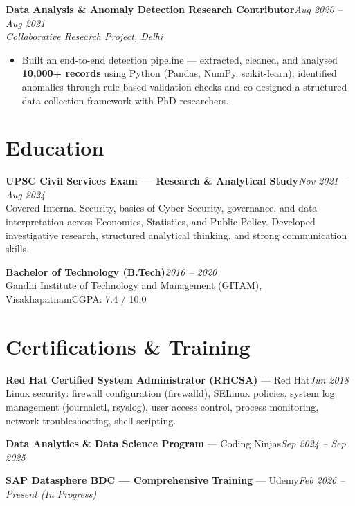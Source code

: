 \documentclass[10pt, letterpaper]{article}
\newcommand{\role}[3]{%
  \vspace{2pt}%
  {\bfseries #1}\hfill{\small\color{muted}\textit{#3}}\\[-2pt]%
  {\small\color{muted}\textit{#2}}%
}
\begin{document}
\vspace{1pt}

\role{Data Analysis \& Anomaly Detection Research Contributor}{Collaborative Research Project, Delhi}{Aug 2020 – Aug 2021}

\begin{itemize}
  \item Built an end-to-end detection pipeline — extracted, cleaned, and analysed \textbf{10,000+ records} using Python (Pandas, NumPy, scikit-learn); identified anomalies through rule-based validation checks and co-designed a structured data collection framework with PhD researchers.
\end{itemize}

\section{Education}

{\bfseries UPSC Civil Services Exam — Research \& Analytical Study}\hfill{\small\color{muted}\textit{Nov 2021 – Aug 2024}}\\
{\small\color{muted}Covered Internal Security, basics of Cyber Security, governance, and data interpretation across Economics, Statistics, and Public Policy. Developed investigative research, structured analytical thinking, and strong communication skills.}

\vspace{2pt}
{\bfseries Bachelor of Technology (B.Tech)}\hfill{\small\color{muted}\textit{2016 – 2020}}\\
{\small\color{muted}Gandhi Institute of Technology and Management (GITAM), Visakhapatnam\hfill CGPA: 7.4 / 10.0}

\section{Certifications \& Training}

{\bfseries Red Hat Certified System Administrator (RHCSA)} — Red Hat\hfill{\small\color{muted}\textit{Jun 2018}}\\
{\small\color{muted}Linux security: firewall configuration (firewalld), SELinux policies, system log management (journalctl, rsyslog), user access control, process monitoring, network troubleshooting, shell scripting.}

\vspace{1pt}
{\bfseries Data Analytics \& Data Science Program} — Coding Ninjas\hfill{\small\color{muted}\textit{Sep 2024 – Sep 2025}}

\vspace{1pt}
{\bfseries SAP Datasphere BDC — Comprehensive Training} — Udemy\hfill{\small\color{muted}\textit{Feb 2026 – Present \emph{(In Progress)}}}

\end{document}
